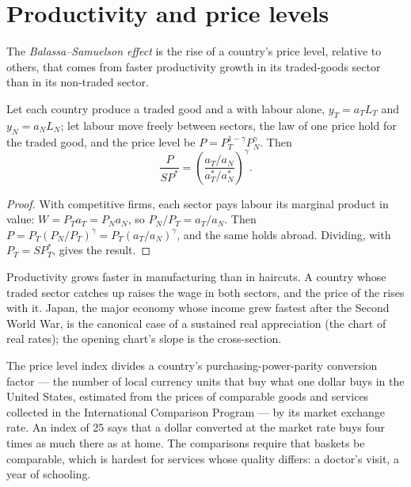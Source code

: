 \section{Productivity and price levels}\label{sec:b3:exchange-rates:balassa-samuelson}

\begin{definition}\label{def:b3:exchange-rates:balassa-samuelson}
The \emph{Balassa--Samuelson effect} is the rise of a country's price level, relative
to others, that comes from faster productivity growth in its traded-goods sector
than in its non-traded sector.
\end{definition}

\begin{proposition}\label{prop:b3:exchange-rates:balassa-samuelson}
Let each country produce a traded good and a  with labour alone,
$y_T = a_TL_T$ and $y_N = a_NL_N$; let labour move freely between sectors, the law of one
price hold for the traded good, and the price level be $P = P_T^{1-\gamma}P_N^\gamma$. Then
\[
\frac{P}{SP^*} = \left(\frac{a_T/a_N}{a_T^*/a_N^*}\right)^{\gamma}.
\]
\end{proposition}

\begin{proof}
With competitive firms, each sector pays labour its marginal product in value:
$W = P_Ta_T = P_Na_N$, so $P_N/P_T = a_T/a_N$. Then $P = P_T(P_N/P_T)^\gamma = P_T(a_T/a_N)^\gamma$, and the
same holds abroad. Dividing, with $P_T = SP_T^*$, gives the result.
\end{proof}

Productivity grows faster in manufacturing than in haircuts. A country whose
traded sector catches up raises the wage in both sectors, and the price of the
 rises with it. Japan, the major economy whose income grew fastest
after the Second World War, is the canonical case of a sustained real appreciation
(the chart of real rates); the opening chart's slope is the cross-section.

\begin{measure}
The price level index divides a country's purchasing-power-parity conversion
factor --- the number of local currency units that buy what one dollar buys in the
United States, estimated from the prices of comparable goods and services collected
in the International Comparison Program --- by its market exchange rate. An index
of 25 says that a dollar converted at the market rate buys four times as much there
as at home. The comparisons require that baskets be comparable, which is hardest
for services whose quality differs: a doctor's visit, a year of schooling.
\end{measure}

